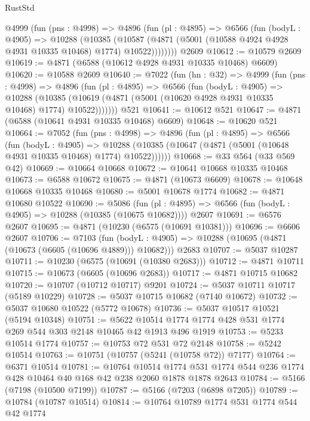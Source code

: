 \begin{lexlean}{RustStd}
\begin{coremodule}
{\begin{coremodule}
{{{{{{{{{{{{{{{{{{{{{{{{{{{{{      @4999
        (fun (pns : @4998) =>
        @4896
          (fun (pl : @4895) =>
          @6566
            (fun (bodyL : @4905) =>
            @10288
              (@10385
                (@10587 (@4871 (@5001 (@10588 @4924 @4928 @4931 @10335 @10468) @1774) @10522))))))))
    @2609
@10612 := @10579 @2609
@10619 := @4871 (@6588 (@10612 @4928 @4931 @10335 @10468) @6609)
@10620 := @10588 @2609
@10640 := @7022
    (fun (hn : @32) =>
    @4999
      (fun (pns : @4998) =>
      @4896
        (fun (pl : @4895) =>
        @6566
          (fun (bodyL : @4905) =>
          @10288
            (@10385 (@10619 (@4871 (@5001 (@10620 @4928 @4931 @10335 @10468) @1774) @10522)))))))
    @521
@10641 := @10612 @521
@10647 := @4871 (@6588 (@10641 @4931 @10335 @10468) @6609)
@10648 := @10620 @521
@10664 := @7052
    (fun (pns : @4998) =>
    @4896
      (fun (pl : @4895) =>
      @6566
        (fun (bodyL : @4905) =>
        @10288 (@10385 (@10647 (@4871 (@5001 (@10648 @4931 @10335 @10468) @1774) @10522))))))
@10668 := @33 @564 (@33 @569 @42)
@10669 := @10664 @10668
@10672 := @10641 @10668 @10335 @10468
@10673 := @6588 @10672
@10675 := @4871 (@10673 @6609)
@10678 := @10648 @10668 @10335 @10468
@10680 := @5001 @10678 @1774
@10682 := @4871 @10680 @10522
@10690 := @5086
    (fun (pl : @4895) => @6566 (fun (bodyL : @4905) => @10288 (@10385 (@10675 @10682))))
    @2607
@10691 := @6576 @2607
@10695 := @4871 (@10230 (@6575 (@10691 @10381)))
@10696 := @6606 @2607
@10706 := @7103
    (fun (bodyL : @4905) => @10288 (@10695 (@4871 (@10673 (@6605 (@10696 @4889))) @10682)))
    @2683
@10707 := @5037 @10287
@10711 := @10230 (@6575 (@10691 (@10380 @2683)))
@10712 := @4871 @10711
@10715 := @10673 (@6605 (@10696 @2683))
@10717 := @4871 @10715 @10682
@10720 := @10707 (@10712 @10717) @9201
@10724 := @5037 @10711 @10717 (@5189 @10229)
@10728 := @5037 @10715 @10682 (@7140 @10672)
@10732 := @5037 @10680 @10522 (@5772 @10678)
@10736 := @5037 @10517 @10521 (@5194 @10348)
@10751 := @5622 @10514 @1774 @1774 @428 @531 @1774 @269 @544 @303 @2148 @10465 @42 @1913 @496 @1919
@10753 := @5233 @10514 @1774
@10757 := @10753 @72 @531 @72 @2148
@10758 := @5242 @10514
@10763 := @10751 (@10757 (@5241 (@10758 @72)) @7177)
@10764 := @6371 @10514
@10781 := @10764
    @10514
    @1774
    @531
    @1774
    @544
    @236
    @1774
    @428
    @10464
    @40
    @168
    @42
    @238
    @2060
    @1878
    @1878
    @2643
@10784 := @5166 (@7198 (@10500 @7199))
@10787 := @5166 (@7203 (@6898 @7205))
@10789 := @10784 (@10787 @10514)
@10814 := @10764
    @10789
    @1774
    @531
    @1774
    @544
    @42
    @1774
}}}}}}}}}}}}}}}}}}}}}}}}}}}}}
\end{coremodule}}
\end{coremodule}
\end{lexlean}
